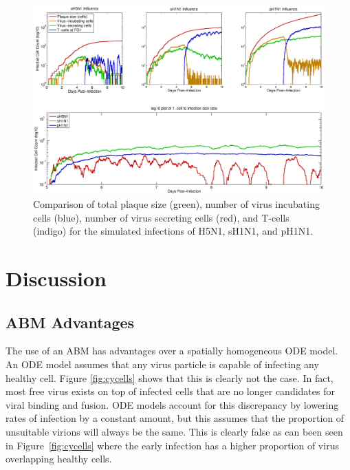 \documentclass[10pt]{article}
\begin{document}
\begin{figure}[ht!]
\begin{center}
 \includegraphics[width=\textwidth]{plaquesize}
 \end{center}
\caption{Comparison of total plaque size (green), number of virus incubating cells (blue), number of virus secreting cells (red), and T-cells (indigo) for the simulated infections of H5N1, sH1N1, and pH1N1.} 
 \label{fig:plaquesize}
\end{figure}


\section*{Discussion}

\subsection*{ABM Advantages}

The use of an ABM has advantages over a spatially homogeneous ODE model.  An ODE model assumes that any virus particle is capable of infecting any healthy cell.  Figure \ref{fig:cycells} shows that this is clearly not the case.  In fact, most free virus exists on top of infected cells that are no longer candidates for viral binding and fusion.  ODE models account for this discrepancy by lowering rates of infection by a constant amount, but this assumes that the proportion of unsuitable virions will always be the same.  This is clearly false as can been seen in Figure~\ref{fig:cycells} where the early infection has a higher proportion of virus overlapping healthy cells.
\end{document}
